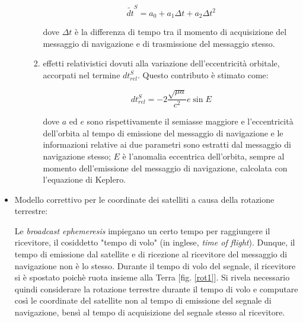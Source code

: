 \documentclass[a4paper,11pt,twoside]{book}
\begin{document}
\begin{itemize}[-]
\begin{enumerate}
\begin{enumerate}
				\begin{equation}
					\tilde{dt}^S = a_0 + a_1 \Delta t + a_2 \Delta t^2
				\end{equation}
				
				dove $\Delta t$ è la differenza di tempo tra il momento di acquisizione del messaggio di navigazione e di trasmissione del messaggio stesso.
				
				\item effetti relativistici dovuti alla variazione dell'eccentricità orbitale, accorpati nel termine $dt^S_{rel}$. Questo contributo è stimato come:
				
				\begin{equation}
					dt^S_{rel} = -2 \frac{\sqrt{\mu a}}{c^2} e \sin E
				\end{equation}
				
				dove $a$ ed $e$ sono rispettivamente il semiasse maggiore e l'eccentricità dell'orbita al tempo di emissione del messaggio di navigazione e le informazioni relative ai due parametri sono estratti dal messaggio di navigazione stesso; $E$ è l'anomalia eccentrica dell'orbita, sempre al momento dell'emissione del messaggio di navigazione, calcolata con l'equazione di Keplero.
			\end{enumerate}
			
		\end{enumerate} 
		
		\item Modello correttivo per le coordinate dei satelliti a causa della rotazione terrestre:
		
		Le \textit{broadcast ephemeresis} impiegano un certo tempo per raggiungere il ricevitore, il cosiddetto "tempo di volo" (in inglese, \textit{time of flight}). Dunque, il tempo di emissione dal satellite e di ricezione al ricevitore del messaggio di navigazione non è lo stesso. Durante il tempo di volo del segnale, il ricevitore si è spostato poichè ruota insieme alla Terra [fig. \ref{rot1}]. Si rivela necessario quindi considerare la rotazione terrestre durante il tempo di volo e computare così le coordinate del satellite non al tempo di emissione del segnale di navigazione, bensì al tempo di acquisizione del segnale stesso al ricevitore.
		
		

\end{itemize}
\end{document}
